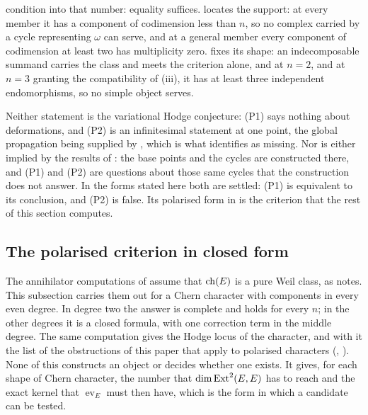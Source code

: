 \begin{remark}
\begin{enumerate}[label=\textup{(P\arabic*)},leftmargin=*]
  condition into that number: equality suffices.  locates
  the support: at every member it has a component of codimension less than
  $n$, so no complex carried by a cycle representing $\omega$ can serve, and
  at a general member every component of codimension at least two has
  multiplicity zero.
   fixes its shape: an indecomposable summand carries the
  class and meets the criterion alone, and at $n=2$, and at $n=3$ granting
  the compatibility of (iii), it has at least three
  independent endomorphisms, so no simple object serves.
\end{enumerate}

Neither statement is the variational Hodge conjecture: (P1) says nothing
about deformations, and (P2) is an infinitesimal statement at one point, the
global propagation being supplied by , which is what
 identifies as missing. Nor is either implied by the
results of : the base points and the cycles are
constructed there, and (P1) and (P2) are questions about those same cycles
that the construction does not answer. In the forms stated here both are
settled: (P1) is equivalent to its conclusion, and (P2) is false. Its
polarised form in  is the criterion that the rest of this
section computes.
\end{remark}

\subsection{The polarised criterion in closed form}

The annihilator computations of  assume that $\operatorname{ch}(E)$
is a pure Weil class, as  notes. This subsection carries
them out for a Chern character with components in every even degree. In
degree two the answer is complete and holds for every $n$; in the other
degrees it is a closed formula, with one correction term in the middle
degree. The same computation gives the Hodge locus of the character,
and with it the list of the obstructions of this paper that apply to
polarised characters (, ).
None of this constructs an object or decides whether one exists. It gives,
for each shape of Chern character, the number that $\dim\operatorname{Ext}^{2}(E,E)$ has
to reach and the exact kernel that $\operatorname{ev}_{E}$ must then have,
which is the form in which a candidate can be tested.


